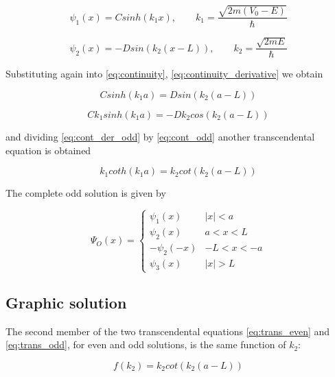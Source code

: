 \documentclass{article}
\begin{document}
\begin{equation}
\psi_{1}(x) = C sinh(k_{1} x), \qquad k_{1} = \frac{\sqrt{2m(V_{0} - E)}}{\hbar}
\end{equation}

\begin{equation}
\psi_{2}(x) = - D sin(k_{2}(x-L)), \qquad k_{2} = \frac{\sqrt{2mE}}{\hbar}
\end{equation}

Substituting again into \eqref{eq:continuity}, \eqref{eq:continuity_derivative} we obtain

\begin{equation}
\label{eq:cont_odd}
C sinh(k_{1}a) =  D sin(k_{2}(a-L))
\end{equation}

\begin{equation}
\label{eq:cont_der_odd}
C k_{1} sinh(k_{1}a) =  - D k_{2} cos(k_{2}(a-L))
\end{equation}

and dividing \eqref{eq:cont_der_odd} by \eqref{eq:cont_odd} another transcendental equation is obtained

\begin{equation}
\label{eq:trans_odd}
k_{1} coth(k_{1}a) = k_{2} cot(k_{2}(a-L))
\end{equation}

The complete odd solution is given by

\begin{equation}
\Psi_{O}(x) = 
  \begin{cases} 
      \psi_{1}(x) & \left|x\right| < a \\
      \psi_{2}(x) & a < x < L \\
      -\psi_{2}(-x) & -L < x < -a \\
      \psi_{3}(x) & \left|x\right| > L
   \end{cases}
\end{equation}

\subsection{Graphic solution}
The second member of the two transcendental equations \eqref{eq:trans_even} and \eqref{eq:trans_odd}, for even and odd solutions, is the same function of \(k_{2}\):

\begin{equation}
f(k_{2}) = k_{2} cot(k_{2}(a-L))
\end{equation}
\end{document}
